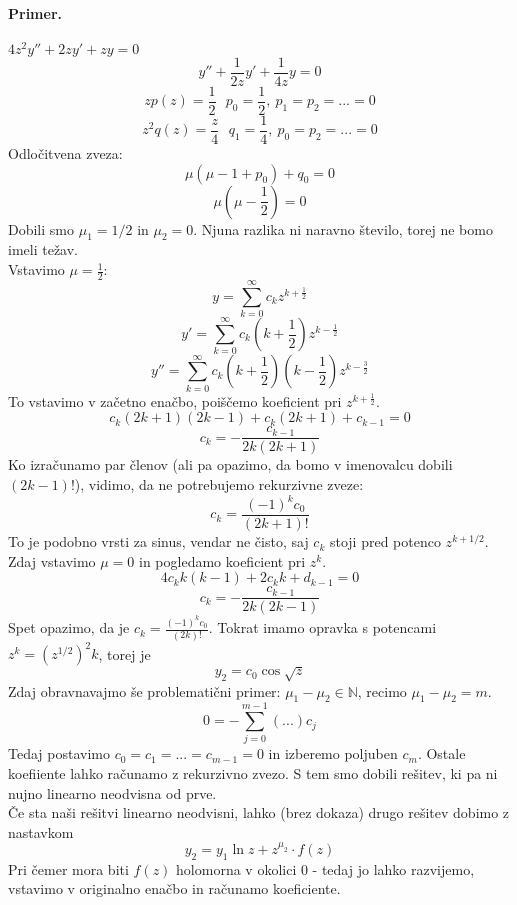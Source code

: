 \documentclass[a4paper]{article}
\newcommand{\N}{\mathbb{N}}
\newcommand{\Sum}[2][0]{\sum_{{#2} = {#1}}^{\infty}}
\begin{document}
\paragraph{Primer.} $4z^2y'' + 2zy' + zy = 0$
$$y'' + \frac{1}{2z} y' + \frac{1}{4z} y = 0$$
$$zp(z) = \frac{1}{2}~~~p_0 = \frac{1}{2},~p_1 = p_2 = ... = 0$$
$$z^2q(z) = \frac{z}{4}~~~q_1 = \frac{1}{4},~p_0 = p_2 = ... = 0$$
Odločitvena zveza: $$\mu\left(\mu - 1 + p_0\right) + q_0 = 0$$
$$\mu \left(\mu - \frac{1}{2}\right) = 0$$
Dobili smo $\mu_1 = 1/2$ in $\mu_2 = 0$. Njuna razlika ni naravno število, torej ne bomo imeli težav. \\
Vstavimo $\mu = \frac{1}{2}$:
$$y = \Sum{k} c_kz^{k+\frac{1}{2}}$$
$$y' = \Sum{k} c_k\left(k + \frac{1}{2}\right)z^{k-\frac{1}{2}}$$
$$y'' = \Sum{k} c_k\left(k + \frac{1}{2}\right)\left(k - \frac{1}{2}\right)z^{k-\frac{3}{2}}$$
To vstavimo v začetno enačbo, poiščemo koeficient pri $z^{k + \frac{1}{2}}$.
$$c_k(2k+1)(2k-1) + c_k(2k+1) + c_{k-1} = 0$$
$$c_k = -\frac{c_{k-1}}{2k(2k+1)}$$
Ko izračunamo par členov (ali pa opazimo, da bomo v imenovalcu dobili $(2k-1)!$), vidimo, da ne potrebujemo rekurzivne zveze:
$$c_k = \frac{(-1)^kc_0}{(2k+1)!}$$
To je podobno vrsti za sinus, vendar ne čisto, saj $c_k$ stoji pred potenco $z^{k+1/2}$.
Zdaj vstavimo $\mu = 0$ in pogledamo koeficient pri $z^k$.
$$4c_kk(k-1)+ 2c_kk + d_{k-1} = 0$$
$$c_k = -\frac{c_{k-1}}{2k(2k-1)}$$
Spet opazimo, da je $\displaystyle{c_k = \frac{(-1)^kc_0}{(2k)!}}$. Tokrat imamo opravka s potencami $z^k = \displaystyle{(z^{1/2})^2k}$, torej je $$y_2 = c_0\cos\sqrt{z}$$
Zdaj obravnavajmo še problematični primer: $\mu_1 - \mu_2 \in \N$, recimo $\mu_1 - \mu_2 = m$.
$$0 = -\sum_{j=0}^{m-1}(...)c_j$$
Tedaj postavimo $c_0 = c_1 = ... = c_{m-1} = 0$ in izberemo poljuben $c_m$. Ostale koefiiente lahko računamo z rekurzivno zvezo.
S tem smo dobili rešitev, ki pa ni nujno linearno neodvisna od prve. \\
Če sta naši rešitvi linearno neodvisni, lahko (brez dokaza) drugo rešitev dobimo z nastavkom
$$y_2 = y_1\ln z + z^{\mu_2}\cdot f(z)$$
Pri čemer mora biti $f(z)$ holomorna v okolici $0$ - tedaj jo lahko razvijemo, vstavimo v originalno enačbo in računamo koeficiente.
\end{document}
